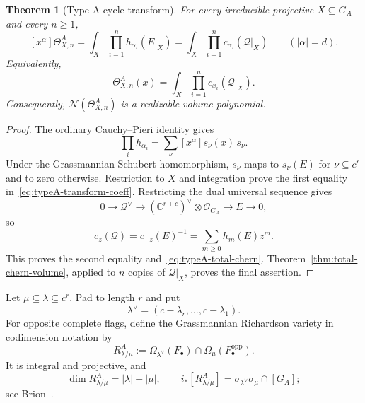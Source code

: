 \documentclass[11pt,a4paper,oneside]{amsart}
\numberwithin{equation}{section}
\newtheorem{theorem}{Theorem}[section]
\theoremstyle{definition}
\theoremstyle{remark}
\newcommand{\C}{\mathbb C}
\newcommand{\cN}{\mathcal N}
\newcommand{\cO}{\mathcal O}
\newcommand{\cQ}{\mathcal Q}
\begin{document}
\begin{theorem}[Type A cycle transform]\label{thm:typeA-transform}
For every irreducible projective $X\subseteq G_A$ and every $n\geq1$,
\begin{equation}\label{eq:typeA-transform-coeff}
 [x^\alpha]\Theta^A_{X,n}
 =\int_X\prod_{i=1}^nh_{\alpha_i}(E|_X)
 =\int_X\prod_{i=1}^nc_{\alpha_i}(\cQ|_X)
 \qquad(|\alpha|=d).
\end{equation}
Equivalently,
\begin{equation}\label{eq:typeA-total-chern}
 \Theta^A_{X,n}(x)=\int_X\prod_{i=1}^nc_{x_i}(\cQ|_X).
\end{equation}
Consequently, $\cN(\Theta^A_{X,n})$ is a realizable volume polynomial.
\end{theorem}

\begin{proof}
The ordinary Cauchy--Pieri identity gives
\[
 \prod_i h_{\alpha_i}
 =\sum_\nu[x^\alpha]s_\nu(x)\,s_\nu.
\]
Under the Grassmannian Schubert homomorphism, $s_\nu$ maps to $s_\nu(E)$ for $\nu\subseteq c^r$ and to zero otherwise.  Restriction to $X$ and integration prove the first equality in~\eqref{eq:typeA-transform-coeff}.  Restricting the dual universal sequence gives
\[
 0\longrightarrow\cQ^\vee\longrightarrow(\C^{r+c})^\vee\otimes\cO_{G_A}
 \longrightarrow E\longrightarrow0,
\]
so
\[
 c_z(\cQ)=c_{-z}(E)^{-1}=\sum_{m\geq0}h_m(E)z^m.
\]
This proves the second equality and~\eqref{eq:typeA-total-chern}.  Theorem~\ref{thm:total-chern-volume}, applied to $n$ copies of $\cQ|_X$, proves the final assertion.
\end{proof}

Let $\mu\subseteq\lambda\subseteq c^r$.  Pad to length $r$ and put
\[
 \lambda^\vee=(c-\lambda_r,\ldots,c-\lambda_1).
\]
For opposite complete flags, define the Grassmannian Richardson variety in codimension notation by
\begin{equation}\label{eq:typeA-Richardson}
 R^A_{\lambda/\mu}
 :=\Omega_{\lambda^\vee}(F_\bullet)
 \cap\Omega_\mu(F_\bullet^{\mathrm{opp}}).
\end{equation}
It is integral and projective, and
\begin{equation}\label{eq:typeA-Richardson-class}
 \dim R^A_{\lambda/\mu}=|\lambda|-|\mu|,
 \qquad
 i_*[R^A_{\lambda/\mu}]
 =\sigma_{\lambda^\vee}\sigma_\mu\cap[G_A];
\end{equation}
see Brion~\cite[Section~1.3]{Brion05}.
\end{document}
